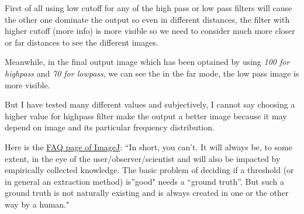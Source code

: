 \documentclass[11pt]{article}
\begin{document}
    First of all using low cutoff for any of the high pass or low pass
filters will cause the other one dominate the output so even in
different distances, the filter with higher cutoff (more info) is more
visible so we need to consider much more closer or far distances to see
the different images.

Meanwhile, in the final output image which has been optained by using
\emph{100 for highpass} and \emph{70 for lowpass}, we can see the in the
far mode, the low pass image is more visible.

But I have tested many different values and subjectively, I cannot say
choosing a higher value for highpass filter make the output a better
image because it may depend on image and its particular frequency
distribution.

Here is the \href{https://imagej.net/Thresholding}{FAQ page of ImageJ}:
``In short, you can't. It will always be, to some extent, in the eye of
the user/observer/scientist and will also be impacted by empirically
collected knowledge. The basic problem of deciding if a threshold (or in
general an extraction method) is''good" needs a ``ground truth''. But
such a ground truth is not naturally existing and is always created in
one or the other way by a human."


    
    
    
    
\end{document}
